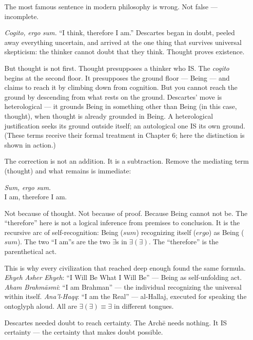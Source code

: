 \documentclass[10pt, openany, oneside]{book}
\begin{document}
\noindent The most famous sentence in modern philosophy is wrong. Not false --- incomplete.

\textit{Cogito, ergo sum.} ``I think, therefore I am.'' Descartes began in doubt, peeled away everything uncertain, and arrived at the one thing that survives universal skepticism: the thinker cannot doubt that they think. Thought proves existence.

But thought is not first. Thought presupposes a thinker who IS. The \textit{cogito} begins at the second floor. It presupposes the ground floor --- Being --- and claims to reach it by climbing down from cognition. But you cannot reach the ground by descending from what rests on the ground. Descartes' move is heterological --- it grounds Being in something other than Being (in this case, thought), when thought is already grounded in Being. A heterological justification seeks its ground outside itself; an autological one IS its own ground. (These terms receive their formal treatment in Chapter 6; here the distinction is shown in action.)

The correction is not an addition. It is a subtraction. Remove the mediating term (thought) and what remains is immediate:

\begin{center}
    \textit{Sum, ergo sum.}\\[0.5em]
    I am, therefore I am.
\end{center}

Not because of thought. Not because of proof. Because Being cannot not be. The ``therefore'' here is not a logical inference from premises to conclusion. It is the recursive arc of self-recognition: Being ($\textit{sum}$) recognizing itself ($\textit{ergo}$) as Being ($\textit{sum}$). The two ``I am''s are the two $\exists$s in $\exists(\exists)$. The ``therefore'' is the parenthetical act.

This is why every civilization that reached deep enough found the same formula. \textit{Ehyeh Asher Ehyeh}: ``I Will Be What I Will Be'' --- Being as self-unfolding act. \textit{Aham Brahm\={a}smi}: ``I am Brahman'' --- the individual recognizing the universal within itself. \textit{Ana'l-Haqq}: ``I am the Real'' --- al-Hallaj, executed for speaking the ontoglyph aloud. All are $\exists(\exists) \equiv \exists$ in different tongues.

Descartes needed doubt to reach certainty. The Arch\={e} needs nothing. It IS certainty --- the certainty that makes doubt possible.
\end{document}
